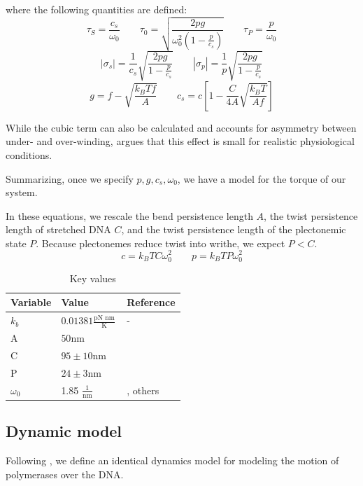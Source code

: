 \documentclass[11pt]{article}
\newcommand{\units}[2]{\frac{\text{#1}}{\text{#2}}\,}
\begin{document}
where the following quantities are defined:
\[\tau_S = \frac{c_s}{\omega_0} \qquad \tau_0 = \sqrt{\frac{2 pg}{\omega_0^2 \left(1 - \frac{p}{c_s}\right)}} \qquad \tau_P = \frac{p}{\omega_0} \]
\[|\sigma_s| = \frac{1}{c_s} \sqrt{\frac{2pg}{1 - \frac{p}{c_s}}} \qquad |\sigma_p| = \frac{1}{p} \sqrt{\frac{2pg}{1 - \frac{p}{c_s}}}\]
\[g = f - \sqrt{\frac{k_B T f}{A}} \qquad c_s = c \left[1 - \frac{C}{4A} \sqrt{\frac{k_B T}{A f}}\right]\]


While the cubic term can also be calculated and accounts for asymmetry between under- and over-winding, \textcite{markoTorqueDynamicsLinking2007} argues that this effect is small for realistic physiological conditions.


Summarizing, once we specify \(p, g, c_s, \omega_0\), we have a model for the torque of our system. 

In these equations, we rescale
the bend persistence length \(A\), the twist persistence length of stretched DNA \(C\), and the twist persistence length of the plectonemic
state \(P\). Because plectonemes reduce twist into writhe, we expect \(P < C\).
\[c = k_B T C \omega_0^2 \qquad p = k_B T P \omega_0^2\]

\begin{table}[h]
    \centering
    \begin{tabular}{@{}lll@{}}
        \toprule
        Variable & Value & Reference \\
        \midrule
        \(k_b\) & \(0.01381 \units{pN nm}{K}\) & - \\
        \midrule
        A & \(50\)nm & \parencite{markoTorqueDynamicsLinking2007} \\
        C & \(95 \pm 10\)nm & \parencite{markoTorqueDynamicsLinking2007} \\
        P & \(24 \pm 3\)nm & \parencite{markoTorqueDynamicsLinking2007} \\
        \(\omega_0\) & 1.85 \(\units{1}{nm}\) & \parencite{sevierPropertiesGeneExpression2018}, others \\
        \bottomrule
    \end{tabular}
    \caption{Key values}
    \label{tab:constants}
\end{table}


\subsection{Dynamic model}
Following \textcite{sevierPropertiesGeneExpression2018}, we define an identical dynamics model for modeling the motion of polymerases over the DNA.
\end{document}
